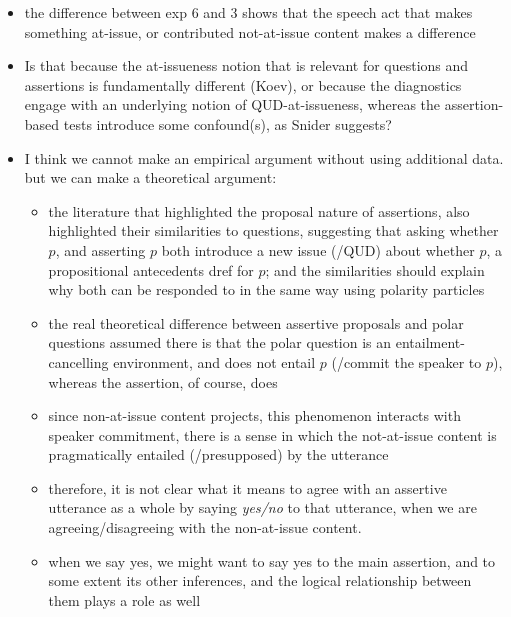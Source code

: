 \documentclass[times,linguex,xcolor]{glossa}
\begin{document}
    \begin{itemize}
      \item the difference between exp 6 and 3 shows that the speech act that makes something at-issue, or contributed not-at-issue content makes a difference

      \item Is that because the at-issueness notion that is relevant for questions and assertions is fundamentally different (Koev), or because the diagnostics engage with an underlying notion of QUD-at-issueness, whereas the assertion-based tests introduce some confound(s), as Snider suggests?

      \item I think we cannot make an empirical argument without using additional data. but we can make a theoretical argument: 
      \begin{itemize}
        \item the literature that highlighted the proposal nature of assertions, also highlighted their similarities to questions, suggesting that asking whether $p$, and asserting $p$ both introduce a new issue (/QUD) about whether $p$, a propositional antecedents dref for $p$; and the similarities should explain why both can be responded to in the same way using polarity particles \citealt{farkas_reacting_2010}

        \item the real theoretical difference between assertive proposals and polar questions assumed there is that the polar question is an entailment-cancelling environment, and does not entail $p$ (/commit the speaker to $p$), whereas the assertion, of course, does

        \item since non-at-issue content projects, this phenomenon interacts with speaker commitment, there is a sense in which the not-at-issue content is pragmatically entailed (/presupposed) by the utterance

        \item therefore, it is not clear what it means to agree with an assertive utterance as a whole by saying \emph{yes/no} to that utterance, when we are agreeing/disagreeing with the non-at-issue content.

        \item when we say yes, we might want to say yes to the main assertion, and to some extent its other inferences, and the logical relationship between them plays a role as well


\end{itemize}
\end{itemize}
\end{document}
